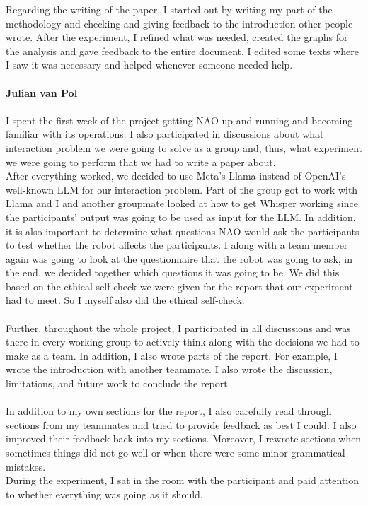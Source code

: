 \documentclass[runningheads]{llncs}
\begin{document}
Regarding the writing of the paper, I started out by writing my part of the methodology and checking and giving feedback to the introduction other people wrote. After the experiment, I refined what was needed, created the graphs for the analysis and gave feedback to the entire document. I edited some texts where I saw it was necessary and helped whenever someone needed help.
\\\\
\textbf{Julian van Pol}
\\\\
I spent the first week of the project getting NAO up and running and becoming familiar with its operations. I also participated in discussions about what interaction problem we were going to solve as a group and, thus, what experiment we were going to perform that we had to write a paper about.
\\
After everything worked, we decided to use Meta's Llama instead of OpenAI's well-known LLM for our interaction problem. Part of the group got to work with Llama and I and another groupmate looked at how to get Whisper working since the participants' output was going to be used as input for the LLM. In addition, it is also important to determine what questions NAO would ask the participants to test whether the robot affects the participants. I along with a team member again was going to look at the questionnaire that the robot was going to ask, in the end, we decided together which questions it was going to be. We did this based on the ethical self-check we were given for the report that our experiment had to meet. So I myself also did the ethical self-check.
\\\\
Further, throughout the whole project, I participated in all discussions and was there in every working group to actively think along with the decisions we had to make as a team. In addition, I also wrote parts of the report. For example, I wrote the introduction with another teammate. I also wrote the discussion, limitations, and future work to conclude the report.
\\\\
In addition to my own sections for the report, I also carefully read through sections from my teammates and tried to provide feedback as best I could. I also improved their feedback back into my sections. Moreover, I  rewrote sections when sometimes things did not go well or when there were some minor grammatical mistakes.
\\
During the experiment, I sat in the room with the participant and paid attention to whether everything was going as it should.
\end{document}
